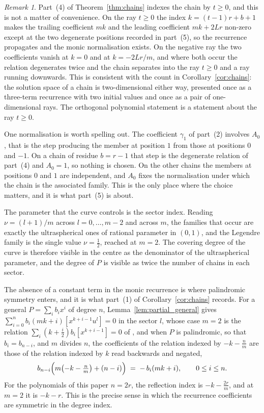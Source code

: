 \documentclass[11pt]{amsart}
\theoremstyle{definition}
\theoremstyle{remark}
\newtheorem{remark}[theorem]{Remark}
\begin{document}
\begin{remark}\label{rem:negative_ray}
Part~(4) of Theorem~\ref{thm:chains} indexes the chain by $t\geq0$, and this is
not a matter of convenience. On the ray $t\geq0$ the index $k=(t-1)r+b+1$ makes
the trailing coefficient $mk$ and the leading coefficient $mk+2Lr$ non-zero
except at the two degenerate positions recorded in part~(5), so the recurrence
propagates and the monic normalisation exists. On the negative ray the two
coefficients vanish at $k=0$ and at $k=-2Lr/m$, and where both occur the
relation degenerates twice and the chain separates into the ray $t\geq0$ and a
ray running downwards. This is consistent with the count in
Corollary~\ref{cor:chains}: the solution space of a chain is two-dimensional
either way, presented once as a three-term recurrence with two initial values
and once as a pair of one-dimensional rays. The orthogonal polynomial statement
is a statement about the ray $t\geq0$.

One normalisation is worth spelling out. The coefficient $\gamma_1$ of
part~(2) involves $A_0$, that is the step producing the member at position $1$
from those at positions $0$ and $-1$. On a chain of residue $b=r-1$ that step is
the degenerate relation of part~(4) and $A_0=1$, so nothing is chosen. On the
other chains the members at positions $0$ and $1$ are independent, and $A_0$
fixes the normalisation under which the chain is the associated family. This is
the only place where the choice matters, and it is what part~(5) is about.
\end{remark}

The parameter that the curve controls is the sector index. Reading
$\nu=(l+1)/m$ across $l=0,\dots,m-2$ and across $m$, the families that occur
are exactly the ultraspherical ones of rational parameter in $(0,1)$, and the
Legendre family is the single value $\nu=\tfrac12$, reached at $m=2$. The
covering degree of the curve is therefore visible in the centre as the
denominator of the ultraspherical parameter, and the degree of $P$ is visible as
twice the number of chains in each sector.

The absence of a constant term in the monic recurrence is where palindromic
symmetry enters, and it is what part~(1) of Corollary~\ref{cor:chains} records.
For a general $P=\sum_ib_ix^i$ of degree $n$, Lemma~\ref{lem:partial_general}
gives $\sum_{i=0}^{n}b_i(mk+i)[x^{k+i-1}u^{l}]=0$ in the sector $l$, whose case
$m=2$ is the relation $\sum_i(k+\tfrac i2)b_i[x^{k+i-1}]=0$ of
\cite[\S2.1]{CoxZhao2018}, and when
$P$ is palindromic, so that $b_i=b_{n-i}$, and $m$ divides $n$, the coefficients
of the relation indexed by $-k-\frac nm$ are those of the relation indexed by
$k$ read backwards and negated,
\[
  b_{n-i}\Bigl(m\bigl(-k-\tfrac nm\bigr)+(n-i)\Bigr) \;=\; -\,b_i(mk+i),
  \qquad 0\leq i\leq n .
\]
For the polynomials of this paper $n=2r$, the reflection index is
$-k-\frac{2r}{m}$, and at $m=2$ it is $-k-r$. This is the precise sense in which
the recurrence coefficients are symmetric in the degree index.
\end{document}
